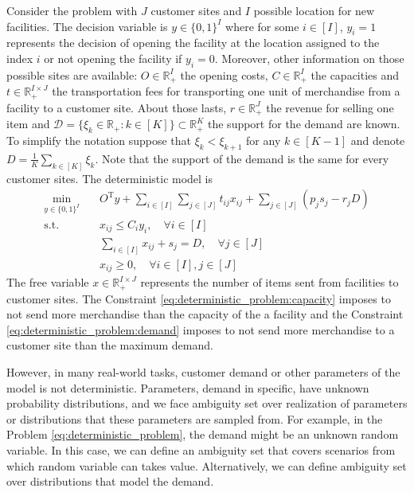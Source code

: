 \documentclass[12pt, letterpaper]{article}
\newcommand{\R}{\mathbb{R}}
\newcommand{\T}{\mathrm{T}}
\newcommand{\Dcal}{\mathcal{D}}
\begin{document}
	Consider the problem with $J$ customer sites and $I$ possible location for new facilities. The decision variable is $y \in \{0, 1\}^I$ where for some $i \in [I]$, $y_i = 1$ represents the decision of opening the facility at the location assigned to the index $i$ or not opening the facility if $y_i = 0$. Moreover, other information on those possible sites are available: $O \in \R_+^I$ the opening costs, $C \in \R_+^I$ the capacities and $t \in \R_+^{I \times J}$ the transportation fees for transporting one unit of merchandise from a facility to a customer site. About those lasts, $r \in \R_+^J$ the revenue for selling one item and $\Dcal = \{\xi_k \in \R_+: k \in [K]\} \subset \R_+^K$ the support for the demand are known. To simplify the notation suppose that $\xi_k < \xi_{k+1}$ for any $k \in [K-1]$ and denote $D = \frac{1}{K} \sum_{k \in [K]} \xi_k$. Note that the support of the demand is the same for every customer sites. The deterministic model is
	\begin{subequations} \label{eq:deterministic_problem}
		\begin{align}
			\min_{y \in \{0, 1\}^I} &\quad O^\T y + \sum_{i \in [I]} \sum_{j \in [J]} t_{ij} x_{ij} + \sum_{j \in [J]} (p_j s_j - r_j D) \\
			\text{s.t.} &\quad x_{ij} \le C_i y_i, \quad \forall i \in [I] \\ \label{eq:deterministic_problem:capacity}
			&\quad \sum_{i \in [I]} x_{ij} + s_j = D, \quad \forall j \in [J] \\ \label{eq:deterministic_problem:demand}
			&\quad x_{ij} \ge 0, \quad \forall i \in [I], j \in [J]
		\end{align}
	\end{subequations}
	The free variable $x \in \R_+^{I \times J}$ represents the number of items sent from facilities to customer sites. The Constraint \eqref{eq:deterministic_problem:capacity} imposes to not send more merchandise than the capacity of the a facility and the Constraint \eqref{eq:deterministic_problem:demand} imposes to not send more merchandise to a customer site than the maximum demand.
	
	However, in many real-world tasks, customer demand or other parameters of the model is not deterministic. Parameters, demand in specific, have unknown probability distributions, and we face ambiguity set over realization of parameters or distributions that these parameters are sampled from. For example, in the Problem \eqref{eq:deterministic_problem}, the demand might be an unknown random variable. In this case, we can define an ambiguity set that covers scenarios from which random variable can takes value. Alternatively, we can define ambiguity set over distributions that model the demand.
	
\end{document}
